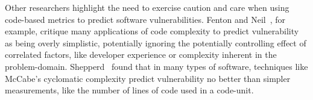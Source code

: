 Other researchers highlight the need to exercise caution and care when
using code-based metrics to predict software vulnerabilities. Fenton and
Neil~\cite{fenton1999critique}, for example, critique many applications
of code complexity to predict vulnerability as being overly simplistic,
potentially ignoring the potentially controlling effect of correlated
factors, like developer experience or complexity inherent in the problem-domain.
Shepperd~\cite{shepperd1988critique} found that in many types of software,
techniques like McCabe's cyclomatic complexity predict vulnerability no
better than simpler measurements, like the number of lines of code used
in a code-unit.

